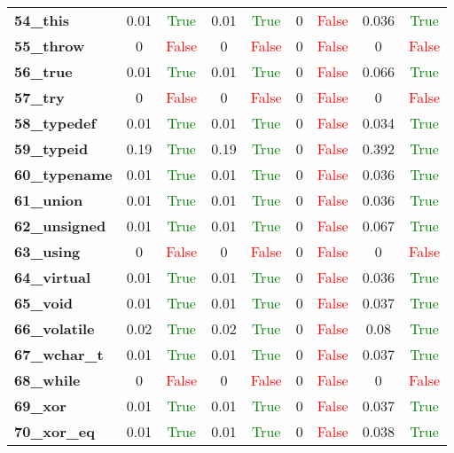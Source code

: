 \documentclass{article}
\begin{document}
\begin{xltabular}{\textwidth}{lcccccccc}
\textbf{54\_this}& 0.01&\textcolor{green}{True}& 0.01&\textcolor{green}{True}& 0&\textcolor{red}{False}& 0.036&\textcolor{green}{True} \\[0.5ex]
\textbf{55\_throw}& 0&\textcolor{red}{False}& 0&\textcolor{red}{False}& 0&\textcolor{red}{False}& 0&\textcolor{red}{False} \\[0.5ex]
\textbf{56\_true}& 0.01&\textcolor{green}{True}& 0.01&\textcolor{green}{True}& 0&\textcolor{red}{False}& 0.066&\textcolor{green}{True} \\[0.5ex]
\textbf{57\_try}& 0&\textcolor{red}{False}& 0&\textcolor{red}{False}& 0&\textcolor{red}{False}& 0&\textcolor{red}{False} \\[0.5ex]
\textbf{58\_typedef}& 0.01&\textcolor{green}{True}& 0.01&\textcolor{green}{True}& 0&\textcolor{red}{False}& 0.034&\textcolor{green}{True} \\[0.5ex]
\textbf{59\_typeid}& 0.19&\textcolor{green}{True}& 0.19&\textcolor{green}{True}& 0&\textcolor{red}{False}& 0.392&\textcolor{green}{True} \\[0.5ex]
\textbf{60\_typename}& 0.01&\textcolor{green}{True}& 0.01&\textcolor{green}{True}& 0&\textcolor{red}{False}& 0.036&\textcolor{green}{True} \\[0.5ex]
\textbf{61\_union}& 0.01&\textcolor{green}{True}& 0.01&\textcolor{green}{True}& 0&\textcolor{red}{False}& 0.036&\textcolor{green}{True} \\[0.5ex]
\textbf{62\_unsigned}& 0.01&\textcolor{green}{True}& 0.01&\textcolor{green}{True}& 0&\textcolor{red}{False}& 0.067&\textcolor{green}{True} \\[0.5ex]
\textbf{63\_using}& 0&\textcolor{red}{False}& 0&\textcolor{red}{False}& 0&\textcolor{red}{False}& 0&\textcolor{red}{False} \\[0.5ex]
\textbf{64\_virtual}& 0.01&\textcolor{green}{True}& 0.01&\textcolor{green}{True}& 0&\textcolor{red}{False}& 0.036&\textcolor{green}{True} \\[0.5ex]
\textbf{65\_void}& 0.01&\textcolor{green}{True}& 0.01&\textcolor{green}{True}& 0&\textcolor{red}{False}& 0.037&\textcolor{green}{True} \\[0.5ex]
\textbf{66\_volatile}& 0.02&\textcolor{green}{True}& 0.02&\textcolor{green}{True}& 0&\textcolor{red}{False}& 0.08&\textcolor{green}{True} \\[0.5ex]
\textbf{67\_wchar\_t}& 0.01&\textcolor{green}{True}& 0.01&\textcolor{green}{True}& 0&\textcolor{red}{False}& 0.037&\textcolor{green}{True} \\[0.5ex]
\textbf{68\_while}& 0&\textcolor{red}{False}& 0&\textcolor{red}{False}& 0&\textcolor{red}{False}& 0&\textcolor{red}{False} \\[0.5ex]
\textbf{69\_xor}& 0.01&\textcolor{green}{True}& 0.01&\textcolor{green}{True}& 0&\textcolor{red}{False}& 0.037&\textcolor{green}{True} \\[0.5ex]
\textbf{70\_xor\_eq}& 0.01&\textcolor{green}{True}& 0.01&\textcolor{green}{True}& 0&\textcolor{red}{False}& 0.038&\textcolor{green}{True} \\[0.5ex]
\bottomrule
\end{xltabular}
\newpage
\end{document}
